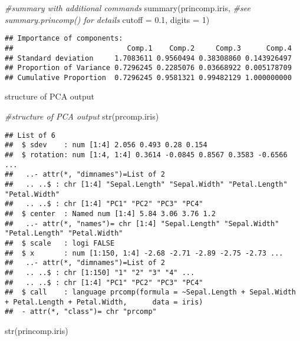 \documentclass[
]{book}
\newenvironment{Shaded}{\begin{snugshade}}{\end{snugshade}}
\newcommand{\AttributeTok}[1]{\textcolor[rgb]{0.77,0.63,0.00}{#1}}
\newcommand{\CommentTok}[1]{\textcolor[rgb]{0.56,0.35,0.01}{\textit{#1}}}
\newcommand{\DecValTok}[1]{\textcolor[rgb]{0.00,0.00,0.81}{#1}}
\newcommand{\FloatTok}[1]{\textcolor[rgb]{0.00,0.00,0.81}{#1}}
\newcommand{\FunctionTok}[1]{\textcolor[rgb]{0.00,0.00,0.00}{#1}}
\newcommand{\NormalTok}[1]{#1}
\begin{document}
\begin{Shaded}
\begin{Highlighting}[]
\CommentTok{\#summary with additional commands}
\FunctionTok{summary}\NormalTok{(princomp.iris,         }\CommentTok{\#see summary.princomp() for details}
        \AttributeTok{cutoff =} \FloatTok{0.1}\NormalTok{,}
        \AttributeTok{digits =} \DecValTok{1}\NormalTok{)}
\end{Highlighting}
\end{Shaded}

\begin{verbatim}
## Importance of components:
##                           Comp.1    Comp.2     Comp.3      Comp.4
## Standard deviation     1.7083611 0.9560494 0.38308860 0.143926497
## Proportion of Variance 0.7296245 0.2285076 0.03668922 0.005178709
## Cumulative Proportion  0.7296245 0.9581321 0.99482129 1.000000000
\end{verbatim}

structure of PCA output

\begin{Shaded}
\begin{Highlighting}[]
\CommentTok{\#structure of PCA output}
\FunctionTok{str}\NormalTok{(prcomp.iris)}
\end{Highlighting}
\end{Shaded}

\begin{verbatim}
## List of 6
##  $ sdev    : num [1:4] 2.056 0.493 0.28 0.154
##  $ rotation: num [1:4, 1:4] 0.3614 -0.0845 0.8567 0.3583 -0.6566 ...
##   ..- attr(*, "dimnames")=List of 2
##   .. ..$ : chr [1:4] "Sepal.Length" "Sepal.Width" "Petal.Length" "Petal.Width"
##   .. ..$ : chr [1:4] "PC1" "PC2" "PC3" "PC4"
##  $ center  : Named num [1:4] 5.84 3.06 3.76 1.2
##   ..- attr(*, "names")= chr [1:4] "Sepal.Length" "Sepal.Width" "Petal.Length" "Petal.Width"
##  $ scale   : logi FALSE
##  $ x       : num [1:150, 1:4] -2.68 -2.71 -2.89 -2.75 -2.73 ...
##   ..- attr(*, "dimnames")=List of 2
##   .. ..$ : chr [1:150] "1" "2" "3" "4" ...
##   .. ..$ : chr [1:4] "PC1" "PC2" "PC3" "PC4"
##  $ call    : language prcomp(formula = ~Sepal.Length + Sepal.Width + Petal.Length + Petal.Width,      data = iris)
##  - attr(*, "class")= chr "prcomp"
\end{verbatim}

\begin{Shaded}
\begin{Highlighting}[]
\FunctionTok{str}\NormalTok{(princomp.iris)}
\end{Highlighting}
\end{Shaded}
\end{document}
